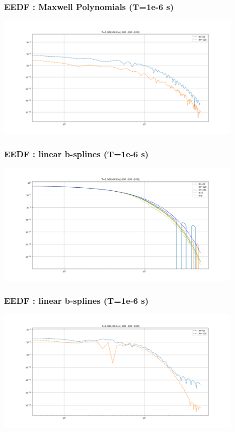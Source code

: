 \documentclass[mathserif, aspectratio=169]{beamer}
\begin{document}
\begin{frame}
	\frametitle{EEDF : Maxwell Polynomials (T=1e-6 s)}
	\begin{center}
		\includegraphics[width=0.9\textwidth]{figures/g0_1_maxwell_eedf_conv.png}
	\end{center}
\end{frame}

\begin{frame}
	\frametitle{EEDF : linear b-splines (T=1e-6 s)}
	\begin{center}
		\includegraphics[width=0.9\textwidth]{figures/g0_1_bspline_eedf.png}
	\end{center}
\end{frame}

\begin{frame}
	\frametitle{EEDF : linear b-splines (T=1e-6 s)}
	\begin{center}
		\includegraphics[width=0.9\textwidth]{figures/g0_1_bspline_eedf_conv.png}
	\end{center}
\end{frame}
\end{document}

